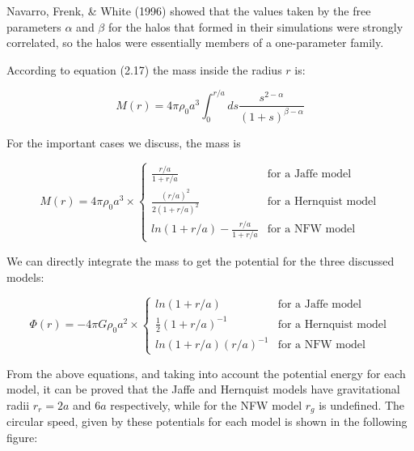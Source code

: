 Navarro, Frenk, \& White (1996) showed that the values taken by the free parameters $\alpha$ and $\beta$ for the halos that formed in their simulations were strongly correlated, so the halos were essentially members of a one-parameter family. 

According to equation (2.17) the mass inside the radius $r$ is:

\begin{equation}
M(r)=4\pi \rho_{0}a^{3}\int_{0}^{r/a}ds\frac{s^{2-\alpha}}{(1+s)^{\beta-\alpha}}
\end{equation}

For the important cases we discuss, the mass is

\begin{equation}
M(r) = 4\pi \rho_{0}a^{3} \times \left\lbrace
\begin{array}{lll}
\frac{r/a}{1+r/a} & \text{for a Jaffe model}\\
\frac{(r/a)^{2}}{2(1+r/a)^{2}} & \text{for a Hernquist model}\\
ln(1+r/a)-\frac{r/a}{1+r/a} & \text{for a NFW model}
\end{array}
\right.
\end{equation} 

We can directly integrate the mass to get the potential for the three discussed models:

\begin{equation}
\Phi(r) = -4\pi G\rho_{0}a^{2} \times \left\lbrace
\begin{array}{lll}
ln(1+r/a) & \text{for a Jaffe model}\\
\frac{1}{2}(1+r/a)^{-1} & \text{for a Hernquist model}\\
ln(1+r/a)(r/a)^{-1} & \text{for a NFW model}
\end{array}
\right.
\end{equation} 

From the above equations, and taking into account the potential energy for each model, it can be proved that the Jaffe and Hernquist models have gravitational radii $r_{r}=2a$ and $6a$ respectively, while for the NFW model $r_{g}$ is undefined. The circular speed, given by these potentials for each model is shown in the following figure: 

